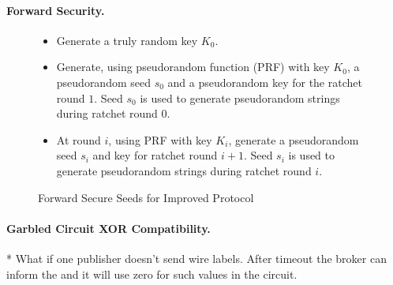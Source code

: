 \paragraph{Forward Security.}

\begin{figure}[h]
\begin{mdframed}[style=myframe]

\begin{itemize}[leftmargin=*]

		\item Generate a truly random key $K_0$.

		\item Generate, using pseudorandom function (PRF) with key $K_0$, a
			pseudorandom seed $s_0$ and a pseudorandom key for the ratchet round $1$.
			Seed $s_0$ is used to generate pseudorandom strings during ratchet round
			$0$.

		\item At round $i$, using PRF with key $K_i$, generate a pseudorandom seed
			$s_i$ and key for ratchet round $i+1$. Seed $s_i$ is used to generate
			pseudorandom strings during ratchet round $i$.

\end{itemize}

\end{mdframed}
\caption{Forward Secure Seeds for Improved Protocol}
\label{fig:basicprotocol}
\end{figure}

\paragraph{Garbled Circuit XOR Compatibility.}


* What if one publisher doesn't send wire labels. After timeout the broker can
inform the \garbler and it will use zero for such values in the circuit.









